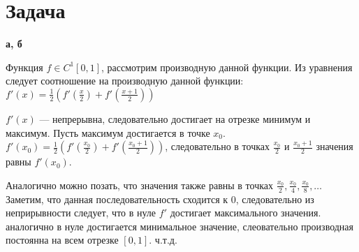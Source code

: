 \section{Задача}

{\bf а, б}

Функция $f \in C^{1}[0, 1]$, рассмотрим производную данной функции.
Из уравнения следует соотношение на производную данной функции: \\
$f'(x) = \frac{1}{2} (f'(\frac{x}{2}) + f'(\frac{x + 1}{2}))$

$f'(x)$ --- непрерывна, следовательно достигает на отрезке минимум и максимум. Пусть
максимум достигается в точке $x_0$.
$f'(x_0) = \frac{1}{2} (f'(\frac{x_0}{2}) + f'(\frac{x_0 + 1}{2}))$, следовательно в точках
$\frac{x_0}{2}$ и $\frac{x_0 + 1}{2}$ значения равны $f'(x_0)$.

Аналогично можно позать, что значения также равны в точках $\frac{x_0}{2}, \frac{x_0}{4}, \frac{x_0}{8}, \ldots$
Заметим, что данная последовательность сходится к $0$, следовательно из неприрывности следует, что в нуле $f'$
достигает максимального значения. аналогично в нуле достигается минимальное значение, слеовательно производная постоянна
на всем отрезке $[0, 1]$. ч.т.д.
